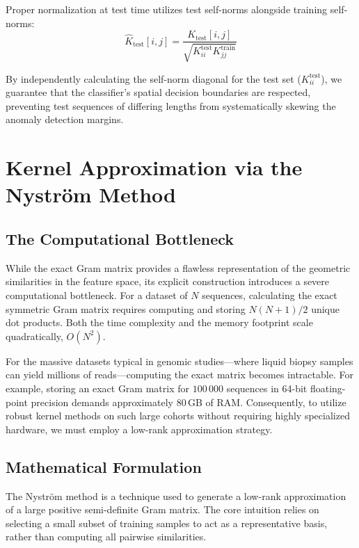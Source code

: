 Proper normalization at test time utilizes test self-norms alongside training self-norms:
\begin{equation}\label{eq:gram-test-normalize}
\hat{K}_{\text{test}}[i, j] = \frac{K_{\text{test}}[i, j]}{\sqrt{K^{\text{test}}_{ii} K^{\text{train}}_{jj}}}
\end{equation}

By independently calculating the self-norm diagonal for the test set ($K^{\text{test}}_{ii}$), we guarantee that the classifier's spatial decision boundaries are respected, preventing test sequences of differing lengths from systematically skewing the anomaly detection margins.

\section{Kernel Approximation via the Nystr\"{o}m Method}\label{sec:nystrom-theory}

\subsection{The Computational Bottleneck}\label{sec:nystrom-bottleneck}

While the exact Gram matrix provides a flawless representation of the geometric similarities in the feature space, its explicit construction introduces a severe computational bottleneck. For a dataset of $N$ sequences, calculating the exact symmetric Gram matrix requires computing and storing $N(N+1)/2$ unique dot products. Both the time complexity and the memory footprint scale quadratically, $O(N^2)$. 

For the massive datasets typical in genomic studies---where liquid biopsy samples can yield millions of reads---computing the exact matrix becomes intractable. For example, storing an exact Gram matrix for $100\,000$ sequences in 64-bit floating-point precision demands approximately $80$\,GB of RAM. Consequently, to utilize robust kernel methods on such large cohorts without requiring highly specialized hardware, we must employ a low-rank approximation strategy.

\subsection{Mathematical Formulation}\label{sec:nystrom-math}

The Nystr\"{o}m method is a technique used to generate a low-rank approximation of a large positive semi-definite Gram matrix. The core intuition relies on selecting a small subset of training samples to act as a representative basis, rather than computing all pairwise similarities.

